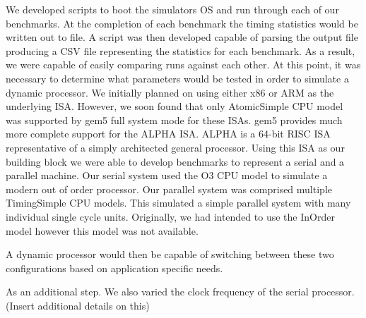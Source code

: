 We developed scripts to boot the simulators OS and run through each of our benchmarks. At the completion of each benchmark the timing statistics would be written out to file. A script was then developed capable of parsing the output file producing a CSV file representing the statistics for each benchmark. As a result, we were capable of easily comparing runs against each other. At this point, it was necessary to determine what parameters would be tested in order to simulate a dynamic processor. We initially planned on using either x86 or ARM as the underlying ISA. However, we soon found that only AtomicSimple CPU model was supported by gem5 full system mode for these ISAs. gem5 provides much more complete support for the ALPHA ISA. ALPHA is a 64-bit RISC ISA representative of a simply architected general processor. Using this ISA as our building block we were able to develop benchmarks to represent a serial and a parallel machine. Our serial system used the O3 CPU model to simulate a modern out of order processor. Our parallel system was comprised multiple TimingSimple CPU models. This simulated a simple parallel system with many individual single cycle units. Originally, we had intended to use the InOrder model however this model was not available.

A dynamic processor would then be capable of switching between these two configurations based on application specific needs.

As an additional step. We also varied the clock frequency of the serial processor. (Insert additional details on this)      

 


